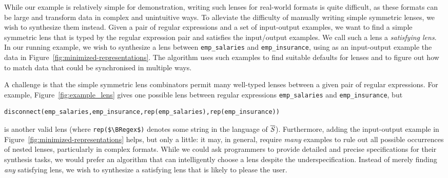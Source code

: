 \documentclass[acmsmall,screen,anonymous]{acmart}
\begin{document}
While our example is relatively simple for demonstration, writing such lenses
for real-world formats is quite difficult, as these formats can be large and
transform data in complex and unintuitive ways. To alleviate the difficulty of
manually writing simple symmetric lenses, we wish to synthesize them instead.
Given a pair of regular expressions and a set of input-output examples, we want
to find a simple symmetric lens that is typed by the regular expression pair and
satisfies the input/output examples. We call such a lens a \emph{satisfying
  lens}. In our running example, we wish to synthesize a lens between
\lstinline{emp_salaries} and \lstinline{emp_insurance}, using as an input-output
example the data in Figure~\ref{fig:minimized-representations}. The algorithm
uses such examples to find suitable defaults for \Disconnect lenses and to
figure out how to match data that could be synchronised in multiple ways.

A challenge is that the simple symmetric lens combinators permit many
well-typed lenses
between a given pair of regular expressions. For example, 
Figure~\ref{fig:example_lens} gives one possible lens between regular
expressions  \lstinline{emp_salaries} and \lstinline{emp_insurance},
but 
%
\begin{lstlisting}
disconnect(emp_salaries,emp_insurance,rep(emp_salaries),rep(emp_insurance))
\end{lstlisting}
%
is another valid lens (where \lstinline{rep($\BRegex$)} denotes some string in the
language of $\overline{\mathit{S}}$). Furthermore, adding the input-output example in
Figure~\ref{fig:minimized-representations} 
helps, but only a little: it may, in general, require {\em many} examples to rule
out all possible occurrences of nested \Disconnect lenses,
particularly in complex formats. 
While we could ask programmers to provide detailed and precise specifications
for their synthesis tasks, we would prefer an algorithm that can intelligently
choose a lens despite the underspecification. Instead of merely finding
\emph{any} satisfying lens, we wish to synthesize a satisfying lens that is
likely to please the user.
\end{document}
